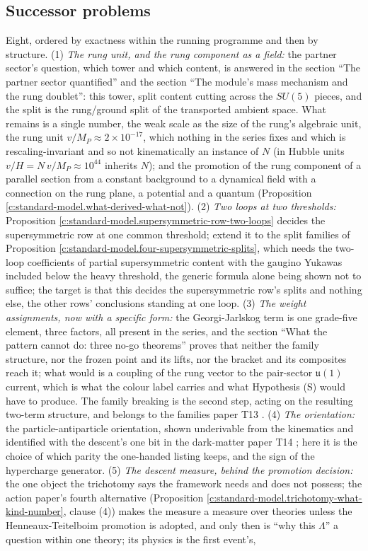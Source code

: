 \documentclass[11pt]{article}
\theoremstyle{definition}
\theoremstyle{plain}
\providecommand{\uu}{}\renewcommand{\uu}{\mathfrak{u}}
\begin{document}
\subsection*{Successor problems}
\label{c:note.standard-model.setting-successor-problems}
Eight, ordered by exactness within the running programme and then by structure. (1) \emph{The rung unit, and the rung component as a field:} the partner sector's question, which tower and which content, is answered in the section ``The partner sector quantified'' and the section ``The module's mass mechanism and the rung doublet'': this tower, split content cutting across the $SU(5)$ pieces, and the split is the rung/ground split of the transported ambient space. What remains is a single number, the weak scale as the size of the rung's algebraic unit, the rung unit $v/M_{P} \approx 2 \times 10^{-17}$, which nothing in the series fixes and which is rescaling-invariant and so not kinematically an instance of $N$ (in Hubble units $v/H = N\,v/M_{P} \approx 10^{44}$ inherits $N$); and the promotion of the rung component of a parallel section from a constant background to a dynamical field with a connection on the rung plane, a potential and a quantum (Proposition \ref{c:standard-model.what-derived-what-not}). (2) \emph{Two loops at two thresholds:} Proposition \ref{c:standard-model.supersymmetric-row-two-loops} decides the supersymmetric row at one common threshold; extend it to the split families of Proposition \ref{c:standard-model.four-supersymmetric-splits}, which needs the two-loop coefficients of partial supersymmetric content with the gaugino Yukawas included below the heavy threshold, the generic formula alone being shown not to suffice; the target is that this decides the supersymmetric row's splits and nothing else, the other rows' conclusions standing at one loop. (3) \emph{The weight assignments, now with a specific form:} the Georgi-Jarlskog term is one grade-five element, three factors, all present in the series, and the section ``What the pattern cannot do: three no-go theorems'' proves that neither the family structure, nor the frozen point and its lifts, nor the bracket and its composites reach it; what would is a coupling of the rung vector to the pair-sector $\uu(1)$ current, which is what the colour label carries and what Hypothesis (S) would have to produce. The family breaking is the second step, acting on the resulting two-term structure, and belongs to the families paper T13 \cite{ButlerT13}. (4) \emph{The orientation:} the particle-antiparticle orientation, shown underivable from the kinematics and identified with the descent's one bit in the dark-matter paper T14 \cite[Prop.~5.2]{ButlerT14}; here it is the choice of which parity the one-handed listing keeps, and the sign of the hypercharge generator. (5) \emph{The descent measure, behind the promotion decision:} the one object the trichotomy says the framework needs and does not possess; the action paper's fourth alternative (Proposition \ref{c:standard-model.trichotomy-what-kind-number}, clause (4)) makes the measure a measure over theories unless the Henneaux-Teitelboim promotion is adopted, and only then is ``why this $\Lambda$'' a question within one theory; its physics is the first event's, 
\end{document}
